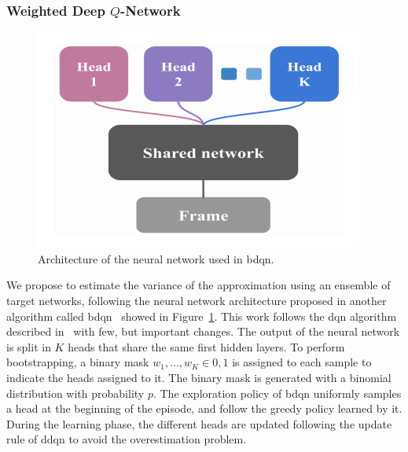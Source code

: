 \subsubsection{Weighted Deep $Q$-Network}\label{S:drl}
\begin{figure}[t]
\begin{center}
  \includegraphics[scale=.5]{img/bdqn.png}
\end{center}
\caption[Boostrapped DQN network]{Architecture of the neural network used in \gls{bdqn}.}\label{F:bdqn-net}
\end{figure}
We propose to estimate the variance of the approximation using an ensemble of target networks, following the neural network architecture proposed in another algorithm called \gls{bdqn}~\cite{osband2017deep} showed in Figure~\ref{F:bdqn-net}. This work follows the \gls{dqn} algorithm described in~\cite{mnih2015human} with few, but important changes. The output of the neural network is split in $K$ heads that share the same first hidden layers. To perform bootstrapping, a binary mask $w_1, \dots, w_K \in {0,1}$ is assigned to each sample to indicate the heads assigned to it. The binary mask is generated with a binomial distribution with probability $p$. The exploration policy of \gls{bdqn} uniformly samples a head at the beginning of the episode, and follow the greedy policy learned by it. During the learning phase, the different heads are updated following the update rule of \gls{ddqn} to avoid the overestimation problem.


